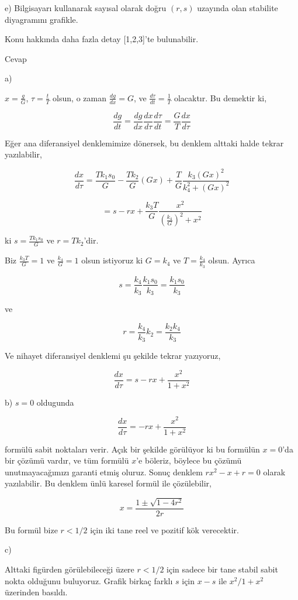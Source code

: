 \documentclass[12pt,fleqn]{article}\usepackage{../../common}
\begin{document}
e) Bilgisayarı kullanarak sayısal olarak doğru $(r,s)$ uzayında olan stabilite
diyagramını grafikle.

Konu hakkında daha fazla detay [1,2,3]'te bulunabilir.

Cevap

a) 

$x=\frac{g}{G}$, $\tau=\frac{t}{T}$ olsun, o zaman $\frac{dg}{dx} = G$, ve
$\frac{d\tau}{dt} = \frac{1}{T}$ olacaktır. Bu demektir ki,

$$ \frac{dg}{dt} = \frac{dg}{dx}\frac{dx}{d\tau}\frac{d\tau}{dt} =
\frac{G}{T}\frac{dx}{d\tau}
$$

Eğer ana diferansiyel denklemimize dönersek, bu denklem alttaki halde tekrar
yazılabilir,

$$ \frac{dx}{d\tau} = \frac{Tk_1s_0}{G}-\frac{Tk_2}{G}(Gx) +
\frac{T}{G} \frac{k_3(Gx)^2}{k_4^2 + (Gx)^2}
$$

$$ = s - rx + \frac{k_3T}{G} \frac{x^2}{(\frac{k_4}{G})^2 + x^2} $$

ki $s = \frac{Tk_1s_0}{G}$ ve $r = Tk_2$'dir.

Biz $\frac{k_3T}{G} = 1$ ve $\frac{k_4}{G} = 1$ olsun istiyoruz ki $G=k_4$ ve $T
= \frac{k_4}{k_3}$ olsun. Ayrıca

$$ s = \frac{k_4}{k_3}\frac{k_1s_0}{k_3} = \frac{k_1s_0}{k_3}$$

ve

$$ r = \frac{k_4}{k_3}k_2 = \frac{k_2k_4}{k_3} $$

Ve nihayet diferansiyel denklemi şu şekilde tekrar yazıyoruz,

$$ \frac{dx}{d\tau} = s - rx + \frac{x^2}{1+x^2}$$

b) $s=0$ oldugunda

$$ \frac{dx}{d\tau} = - rx + \frac{x^2}{1+x^2}$$

formülü sabit noktaları verir. Açık bir şekilde görülüyor ki bu formülün
$x=0$'da bir çözümü vardır, ve tüm formülü $x$'e böleriz, böylece bu çözümü
unutmayacağımızı garanti etmiş oluruz. Sonuç denklem $rx^2 - x + r = 0 $ olarak
yazılabilir. Bu denklem ünlü karesel formül ile çözülebilir,

$$ x = \frac{1 \pm \sqrt{1-4r^2}}{2r} $$

Bu formül bize $r<1/2$ için iki tane reel ve pozitif kök verecektir. 

c)

Alttaki figürden görülebileceği üzere $r<1/2$ için sadece bir tane stabil sabit
nokta olduğunu buluyoruz. Grafik birkaç farklı $s$ için $x-s$ ile $x^2/1+x^2$
üzerinden basıldı.
\end{document}
